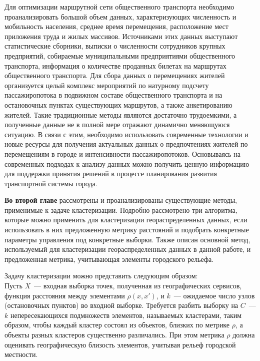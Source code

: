Для оптимизации маршрутной сети общественного транспорта необходимо проанализировать большой объем данных, характеризующих численность и мобильность населения, среднее время перемещения, расположение мест приложения труда и жилых массивов. Источниками этих данных выступают статистические сборники, выписки о численности сотрудников крупных предприятий, собираемые муниципальными предприятиями общественного транспорта, информация о количестве проданных билетах на маршрутах общественного транспорта. Для сбора данных о перемещениях жителей организуется целый комплекс мероприятий по натурному подсчету пассажиропотока в подвижном составе общественного транспорта и на остановочных пунктах существующих маршрутов, а также анкетированию жителей. Такие традиционные методы являются достаточно трудоемкими, а полученные данные не в полной мере отражают динамично меняющуюся ситуацию. В связи с этим, необходимо использовать современные технологии и новые ресурсы для получения актуальных данных о предпочтениях жителей по перемещениям в городе и интенсивности пассажиропотоков. Основываясь на современных подходах к анализу данных можно получить ценную информацию для поддержки принятия решений в процессе планирования развития транспортной системы города.

\textbf{Во второй главе} рассмотрены и проанализированы существующие методы, применимые к задаче кластеризации. Подробно рассмотрено три алгоритма, которые можно применить для кластеризации геораспределенных данных, если использовать в них предложенную метрику расстояний и подобрать конкретные параметры управления под конкретные выборки. Также описан основной метод, используемый для кластеризации геораспределенных данных в данной работе, и предложенная метрика, учитывающая элементы городского рельефа.

Задачу кластеризации можно представить следующим образом:\\
Пусть \( X \)~--- входная выборка точек, полученная из географических сервисов, функция расстояния между элементами \( \rho(x, x') \), и \( k \)~--- ожидаемое число узлов (остановочных пунктов) во входной выборке. Требуется разбить выборку на \( C \)~--- \( k \) непересекающихся подмножеств элементов, называемых кластерами, таким образом, чтобы каждый кластер состоял из объектов, близких по метрике \( \rho \), а объекты разных кластеров существенно различались. При этом метрика \( \rho \) должна оценивать географическую близость элементов, учитывая рельеф городской местности.

